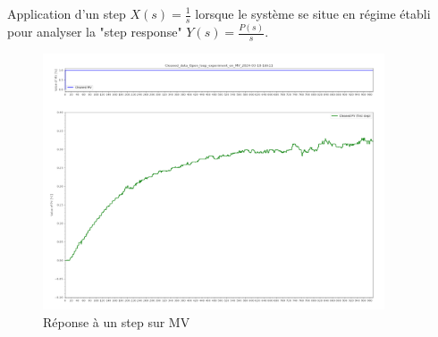 \documentclass{article}
\begin{document}
Application d'un step $X(s) = \frac{1}{s}$ lorsque le système se situe en régime établi pour analyser la "step response" $Y(s) = \frac{P(s)}{s}$.
\begin{figure}[h]
    \centering
    \includegraphics[width=0.9\textwidth]{../Plots/Graphical_methods_Cleaned_data_Open_loop_experiment_on_MV_2024-03-18-16h11.png}
    \caption{Réponse à un step sur MV}
    \label{fig:MV_step_response}
\end{figure}
\end{document}
